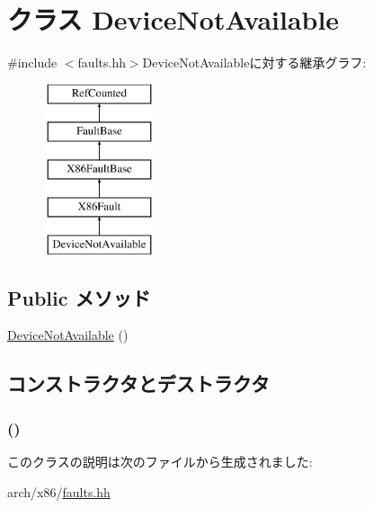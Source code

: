 \hypertarget{classX86ISA_1_1DeviceNotAvailable}{
\section{クラス DeviceNotAvailable}
\label{classX86ISA_1_1DeviceNotAvailable}
}


{\ttfamily \#include $<$faults.hh$>$}DeviceNotAvailableに対する継承グラフ:\begin{figure}[H]
\begin{center}
\leavevmode
\includegraphics[height=5cm]{classX86ISA_1_1DeviceNotAvailable}
\end{center}
\end{figure}
\subsection*{Public メソッド}
\begin{DoxyCompactItemize}
\item 
\hyperlink{classX86ISA_1_1DeviceNotAvailable_a64b7f6346bde7c6f4483b76a4a7c03c5}{DeviceNotAvailable} ()
\end{DoxyCompactItemize}


\subsection{コンストラクタとデストラクタ}
\hypertarget{classX86ISA_1_1DeviceNotAvailable_a64b7f6346bde7c6f4483b76a4a7c03c5}{
\subsubsection[{DeviceNotAvailable}]{ ()}}
\label{classX86ISA_1_1DeviceNotAvailable_a64b7f6346bde7c6f4483b76a4a7c03c5}



\begin{DoxyCode}
258                              :
259             X86Fault("Device-Not-Available", "#NM", 7)
260         {}
    };
\end{DoxyCode}


このクラスの説明は次のファイルから生成されました:\begin{DoxyCompactItemize}
\item 
arch/x86/\hyperlink{arch_2x86_2faults_8hh}{faults.hh}\end{DoxyCompactItemize}
